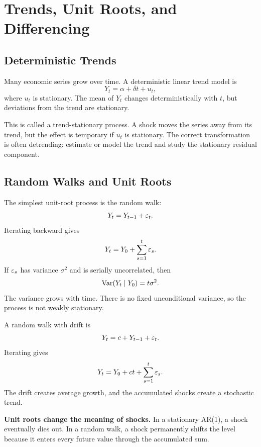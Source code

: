 \section{Trends, Unit Roots, and Differencing}

\subsection{Deterministic Trends}
Many economic series grow over time. A deterministic linear trend model is
\begin{equation}
Y_t=\alpha+\delta t+u_t,
\label{eq:trend_stationary}
\end{equation}
where $u_t$ is stationary. The mean of $Y_t$ changes deterministically with $t$, but deviations from the trend are stationary.

This is called a trend-stationary process. A shock moves the series away from its trend, but the effect is temporary if $u_t$ is stationary. The correct transformation is often detrending: estimate or model the trend and study the stationary residual component.

\subsection{Random Walks and Unit Roots}
The simplest unit-root process is the random walk:
\begin{equation}
Y_t=Y_{t-1}+\varepsilon_t.
\label{eq:rw}
\end{equation}
Iterating backward gives
\begin{equation}
Y_t=Y_0+\sum_{s=1}^{t}\varepsilon_s.
\label{eq:rw_sum}
\end{equation}
If $\varepsilon_s$ has variance $\sigma^2$ and is serially uncorrelated, then
\[
\operatorname{Var}(Y_t\mid Y_0)=t\sigma^2.
\]
The variance grows with time. There is no fixed unconditional variance, so the process is not weakly stationary.

A random walk with drift is
\begin{equation}
Y_t=c+Y_{t-1}+\varepsilon_t.
\label{eq:rw_drift}
\end{equation}
Iterating gives
\[
Y_t=Y_0+ct+\sum_{s=1}^{t}\varepsilon_s.
\]
The drift creates average growth, and the accumulated shocks create a stochastic trend.

\begin{boxD}
\textbf{Unit roots change the meaning of shocks.}
In a stationary AR(1), a shock eventually dies out. In a random walk, a shock permanently shifts the level because it enters every future value through the accumulated sum.
\end{boxD}

